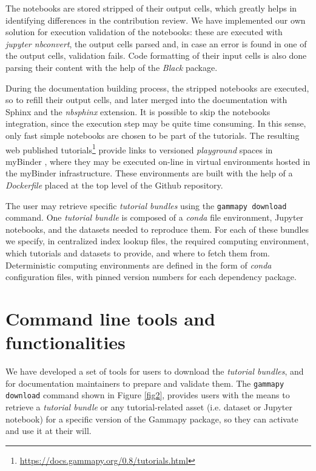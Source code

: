\documentclass[11pt,twoside]{article}
\begin{document}
The notebooks are stored stripped of their output cells, which greatly helps in identifying differences in the contribution review. We have implemented our own solution for execution validation of the notebooks: these are executed with \textit{jupyter nbconvert}, the output cells parsed and, in case an error is found in one of the output cells, validation fails. Code formatting of their input cells is also done parsing their content with the help of the \textit{Black} package.

During the documentation building process, the stripped notebooks are executed, so to refill their output cells, and later merged into the documentation with Sphinx and the \textit{nbsphinx} extension. It is possible to skip the notebooks integration, since the execution step may be quite time consuming. In this sense, only fast simple notebooks are chosen to be part of the tutorials. The resulting web published tutorials\footnote{\url{https://docs.gammapy.org/0.8/tutorials.html}} provide links to versioned \textit{playground} spaces in myBinder \citep{project_jupyter-proc-scipy-2018}, where they may be executed on-line in virtual environments hosted in the myBinder infrastructure. These environments are built with the help of a \textit{Dockerfile} placed at the top level of the Github repository. 

The user may retrieve specific \textit{tutorial bundles} using the {\tt gammapy download} command. One \textit{tutorial bundle} is composed of a \textit{conda} file environment, Jupyter notebooks, and the datasets needed to reproduce them. For each of these bundles we specify, in centralized index lookup files, the required computing environment, which tutorials and datasets to provide, and where to fetch them from. Deterministic computing environments are defined in the form of \textit{conda} configuration files, with pinned version numbers for each dependency package. 

\section{Command line tools and functionalities}

We have developed a set of tools for users to download the \textit{tutorial bundles}, and for documentation maintainers to prepare and validate them. The {\tt gammapy download} command shown in Figure \ref{fig2}, provides users with the means to retrieve a \textit{tutorial bundle} or any tutorial-related asset (i.e. dataset or Jupyter notebook) for a specific version of the Gammapy package, so they can activate and use it at their will.
\end{document}
